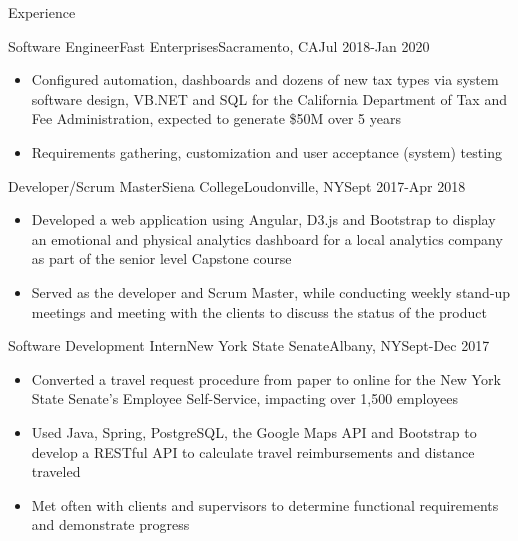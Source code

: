 \documentclass[]{xjavathehutt}
\begin{document}
\makeheader


\begin{cvsection}{Experience}
  \begin{cvsubsection}{Software Engineer}{Fast Enterprises}{Sacramento, CA}{Jul 2018-Jan 2020}
    \begin{itemize}
      \item{Configured automation, dashboards and dozens of new tax types via system software
        design, VB.NET and SQL for the California Department of Tax and Fee Administration, expected
      to generate \$50M over 5 years}
      \item{Requirements gathering, customization and user acceptance (system) testing}
    \end{itemize}
  \end{cvsubsection}

  \begin{cvsubsection}{Developer/Scrum Master}{Siena College}{Loudonville, NY}{Sept 2017-Apr 2018}
    \begin{itemize}
      \item{Developed a web application using Angular, D3.js and Bootstrap to display an emotional and physical
          analytics dashboard for a local analytics company as part of the senior level Capstone course}
      \item{Served as the developer and Scrum Master, while conducting weekly stand-up meetings and
        meeting with the clients to discuss the status of the product}
    \end{itemize}
  \end{cvsubsection}

  \begin{cvsubsection}{Software Development Intern}{New York State Senate}{Albany, NY}{Sept-Dec 2017}
    \begin{itemize}
      \item{Converted a travel request procedure from paper to online for the New York
        State Senate's Employee Self-Service, impacting over 1,500 employees}
      \item{Used Java, Spring, PostgreSQL, the Google Maps API and Bootstrap to develop a RESTful API to calculate travel reimbursements and distance traveled}
      \item{Met often with clients and supervisors to determine functional requirements and demonstrate progress}
    \end{itemize}
  \end{cvsubsection}


\end{cvsection}
\end{document}

